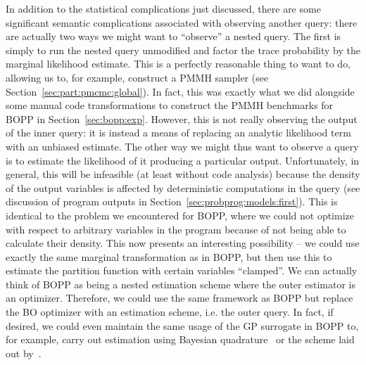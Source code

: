 In addition to the statistical complications just discussed,
there are some significant semantic complications associated with observing
another query: there are actually two ways we might want to ``observe'' a nested query.
The first is simply to run the nested query unmodified and factor the trace probability
by the marginal likelihood estimate.  This is a perfectly reasonable thing to want to do,
allowing us to, for example, construct a PMMH sampler (see
Section~\ref{sec:part:pmcmc:global}).  In fact, this was exactly what we did alongside
some manual code transformations to
construct the PMMH benchmarks for BOPP in Section~\ref{sec:bopp:exp}.  However,
this is not really observing the output of the inner query: it is instead a means of
replacing an analytic likelihood term with an unbiased estimate.  The other way we might thus
want to observe a query is to estimate the likelihood of it producing a particular output.
Unfortunately, in general, this will be infeasible (at least without code analysis) 
because the density of the output variables is affected by deterministic computations in the query
(see discussion of program outputs in Section~\ref{sec:probprog:models:first}).  
This is identical to the
problem we encountered for BOPP, where we could not optimize with respect to arbitrary
variables in the program because of not being able to calculate their density.
This now presents an interesting possibility -- we could use exactly the same
marginal transformation as in BOPP, but then use this to estimate the partition
function with certain variables ``clamped''.  We can actually think of BOPP as being
a nested estimation scheme where the outer estimator is an optimizer.  Therefore, we
could use the same framework as BOPP but replace the BO optimizer
with an estimation scheme, i.e. the outer query.  In fact, if desired, we could even 
maintain the same usage of the GP surrogate in BOPP to, for example, carry out estimation
using Bayesian quadrature~\citep{osborne2012active} or the scheme laid out
by~\citep{gutmann2016bayesian}.

